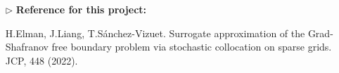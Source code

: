 \documentclass{beamer}
\begin{document}
\begin{frame}[t]
\begin{itemize}[leftmargin=5pt]
{\begin{itemize}[leftmargin=0pt]
        \end{itemize}
        }
        \item[$\triangleright$] {\bf Reference for this project:}
        
        \vspace{0.5mm}
        {\fontsize{8}{8}\selectfont 
        \textcolor{mygray2}{H.Elman, J.Liang, T.Sánchez-Vizuet. Surrogate approximation of the Grad-Shafranov free boundary problem via stochastic collocation on sparse grids. JCP, 448 (2022).}
        \par}
\end{itemize}
\end{frame}
\end{document}
